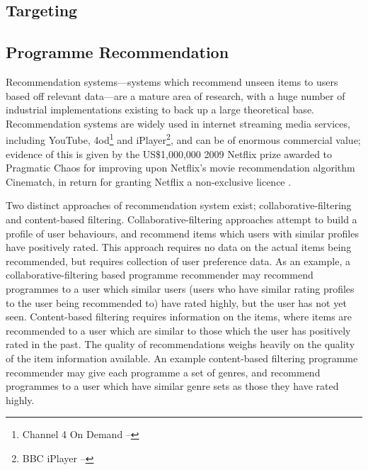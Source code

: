 \subsection{Targeting}


\subsection{Programme Recommendation}

	Recommendation systems---systems which recommend unseen items to users based off relevant data---are a mature area of research, with a huge number of industrial implementations existing to back up a large theoretical base. Recommendation systems are widely used in internet streaming media services, including YouTube, 4od\footnote{Channel 4 On Demand -- } and iPlayer\footnote{BBC iPlayer -- }, and can be of enormous commercial value; evidence of this is given by the US\$1,000,000 2009 Netflix prize awarded to Pragmatic Chaos for improving upon Netflix's movie recommendation algorithm Cinematch, in return for granting Netflix a non-exclusive licence \citep{pragmatic_chaos}.

	Two distinct approaches of recommendation system exist; collaborative-filtering and content-based filtering. Collaborative-filtering approaches attempt to build a profile of user behaviours, and recommend items which users with similar profiles have positively rated. This approach requires no data on the actual items being recommended, but requires collection of user preference data. As an example, a collaborative-filtering based programme recommender may recommend programmes to a user which similar users (users who have similar rating profiles to the user being recommended to) have rated highly, but the user has not yet seen. Content-based filtering requires information on the items, where items are recommended to a user which are similar to those which the user has positively rated in the past. The quality of recommendations weighs heavily on the quality of the item information available. An example content-based filtering programme recommender may give each programme a set of genres, and recommend programmes to a user which have similar genre sets as those they have rated highly.

